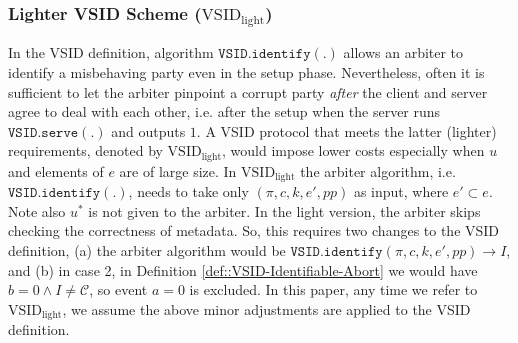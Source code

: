 

\subsubsection{Lighter VSID Scheme ($\text{VSID}_{\scriptscriptstyle\text{light}}$)}\label{remark::light-VSID}
In the VSID  definition, algorithm  $\mathtt{VSID.identify}(.)$    allows an arbiter  to identify a misbehaving party even in the setup phase. Nevertheless, often it is sufficient  to let the arbiter pinpoint a corrupt party \emph{after} the client and server agree to deal with each other, i.e. after the setup when the server runs  $\mathtt{VSID.serve}(.)$ and outputs $1$. A VSID protocol that meets the latter (lighter) requirements, denoted by $\text{VSID}_{\scriptscriptstyle \text{light}}$, would impose lower costs  especially when $u$ and elements of $e$ are of large size. In $\text{VSID}_{\scriptscriptstyle\text{light}}$  the arbiter algorithm, i.e. $\mathtt{VSID.identify}(.)$, needs to take only $(\pi, c, k, e',{pp})$ as input, where $e'\subset e$. Note also $u^{\scriptscriptstyle *}$ is not given to the arbiter. In the light version, the arbiter   skips  checking the correctness of metadata. So, this requires two changes to the VSID definition, (a) the arbiter algorithm would be   $\mathtt{VSID.identify}(\pi,c,k,e',{pp})\rightarrow I$, and (b) in case 2, in Definition \ref{def::VSID-Identifiable-Abort} we would have $b=0\wedge I\neq \mathcal C$, so event $a=0$ is excluded. In this paper, any time we refer to $\text{VSID}_{\scriptscriptstyle\text{light}}$, we assume the above minor adjustments are applied to the VSID definition. 






